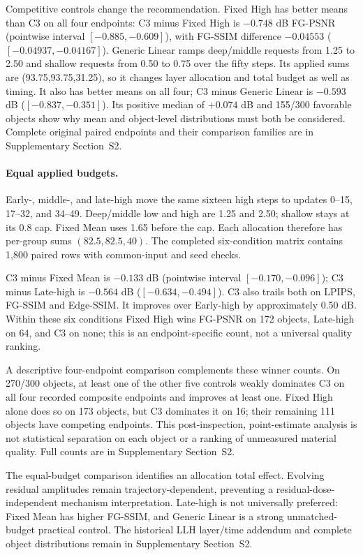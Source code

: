 \documentclass[times,twocolumn,final]{elsarticle}
\begin{document}
Competitive controls change the recommendation. Fixed High has better means than C3 on all four endpoints: C3 minus Fixed High is $-0.748$ dB FG-PSNR (pointwise interval $[-0.885,-0.609]$), with FG-SSIM difference $-0.04553$ ($[-0.04937,-0.04167]$). Generic Linear ramps deep/middle requests from 1.25 to 2.50 and shallow requests from 0.50 to 0.75 over the fifty steps. Its applied sums are (93.75,93.75,31.25), so it changes layer allocation and total budget as well as timing. It also has better means on all four; C3 minus Generic Linear is $-0.593$ dB ($[-0.837,-0.351]$). Its positive median of $+0.074$ dB and 155/300 favorable objects show why mean and object-level distributions must both be considered. Complete original paired endpoints and their comparison families are in Supplementary Section~S2.

\paragraph{Equal applied budgets.}
\label{subsec:matched-budget300}
Early-, middle-, and late-high move the same sixteen high steps to updates 0--15, 17--32, and 34--49. Deep/middle low and high are 1.25 and 2.50; shallow stays at its 0.8 cap. Fixed Mean uses 1.65 before the cap. Each allocation therefore has per-group sums $(82.5,82.5,40)$. The completed six-condition matrix contains 1,800 paired rows with common-input and seed checks.

C3 minus Fixed Mean is $-0.133$ dB (pointwise interval $[-0.170,-0.096]$); C3 minus Late-high is $-0.564$ dB ($[-0.634,-0.494]$). C3 also trails both on LPIPS, FG-SSIM and Edge-SSIM. It improves over Early-high by approximately 0.50 dB. Within these six conditions Fixed High wins FG-PSNR on 172 objects, Late-high on 64, and C3 on none; this is an endpoint-specific count, not a universal quality ranking.

A descriptive four-endpoint comparison complements these winner counts. On 270/300 objects, at least one of the other five controls weakly dominates C3 on all four recorded composite endpoints and improves at least one. Fixed High alone does so on 173 objects, but C3 dominates it on 16; their remaining 111 objects have competing endpoints. This post-inspection, point-estimate analysis is not statistical separation on each object or a ranking of unmeasured material quality. Full counts are in Supplementary Section~S2.

The equal-budget comparison identifies an allocation total effect. Evolving residual amplitudes remain trajectory-dependent, preventing a residual-dose-independent mechanism interpretation. Late-high is not universally preferred: Fixed Mean has higher FG-SSIM, and Generic Linear is a strong unmatched-budget practical control. The historical LLH layer/time addendum and complete object distributions remain in Supplementary Section~S2.
\end{document}

